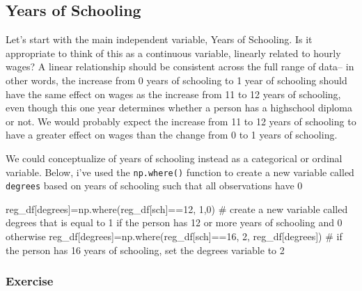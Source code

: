 \documentclass[
  letterpaper,
  DIV=11,
  numbers=noendperiod]{scrreprt}
\newenvironment{Shaded}{\begin{snugshade}}{\end{snugshade}}
\newcommand{\CommentTok}[1]{\textcolor[rgb]{0.37,0.37,0.37}{#1}}
\newcommand{\DecValTok}[1]{\textcolor[rgb]{0.68,0.00,0.00}{#1}}
\newcommand{\NormalTok}[1]{\textcolor[rgb]{0.00,0.23,0.31}{#1}}
\newcommand{\OperatorTok}[1]{\textcolor[rgb]{0.37,0.37,0.37}{#1}}
\newcommand{\StringTok}[1]{\textcolor[rgb]{0.13,0.47,0.30}{#1}}
\begin{document}
\hypertarget{years-of-schooling}{%
\subsection{Years of Schooling}\label{years-of-schooling}}

Let's start with the main independent variable, Years of Schooling. Is
it appropriate to think of this as a continuous variable, linearly
related to hourly wages? A linear relationship should be consistent
across the full range of data-- in other words, the increase from 0
years of schooling to 1 year of schooling should have the same effect on
wages as the increase from 11 to 12 years of schooling, even though this
one year determines whether a person has a highschool diploma or not. We
would probably expect the increase from 11 to 12 years of schooling to
have a greater effect on wages than the change from 0 to 1 years of
schooling.

We could conceptualize of years of schooling instead as a categorical or
ordinal variable. Below, i've used the \texttt{np.where()} function to
create a new variable called \texttt{degrees} based on years of
schooling such that all observations have 0

\begin{Shaded}
\begin{Highlighting}[]
\NormalTok{reg\_df[}\StringTok{\textquotesingle{}degrees\textquotesingle{}}\NormalTok{]}\OperatorTok{=}\NormalTok{np.where(reg\_df[}\StringTok{\textquotesingle{}sch\textquotesingle{}}\NormalTok{]}\OperatorTok{==}\DecValTok{12}\NormalTok{, }\DecValTok{1}\NormalTok{,}\DecValTok{0}\NormalTok{) }\CommentTok{\# create a new variable called degrees that is equal to 1 if the person has 12 or more years of schooling and 0 otherwise}
\NormalTok{reg\_df[}\StringTok{\textquotesingle{}degrees\textquotesingle{}}\NormalTok{]}\OperatorTok{=}\NormalTok{np.where(reg\_df[}\StringTok{\textquotesingle{}sch\textquotesingle{}}\NormalTok{]}\OperatorTok{==}\DecValTok{16}\NormalTok{, }\DecValTok{2}\NormalTok{, reg\_df[}\StringTok{\textquotesingle{}degrees\textquotesingle{}}\NormalTok{]) }\CommentTok{\# if the person has 16 years of schooling, set the degrees variable to 2}
\end{Highlighting}
\end{Shaded}

\hypertarget{exercise-28}{%
\subsubsection{Exercise}\label{exercise-28}}
\end{document}
